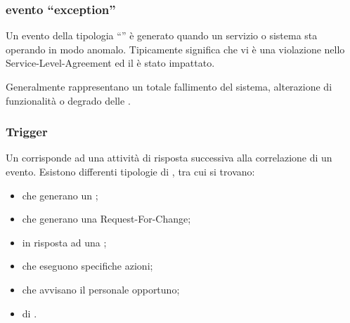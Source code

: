 \subsubsection{evento ``exception''}
Un evento della tipologia ``'' è generato quando un servizio o sistema sta operando in modo anomalo. Tipicamente significa che vi è una violazione nello \ac{Service-Level-Agreement} ed il  è stato impattato.

Generalmente rappresentano un totale fallimento del sistema, alterazione di funzionalità o degrado delle .

\subsubsection{Trigger}
Un  corrisponde ad una attività di risposta successiva alla correlazione di un evento. Esistono differenti tipologie di , tra cui si trovano:

\begin{itemize}
\item{ che generano un ;}
\item{ che generano una \ac{Request-For-Change};}
\item{ in risposta ad una ;}
\item{ che eseguono specifiche azioni;}
\item{ che avvisano il personale opportuno;}
\item{ di .}
\end{itemize}